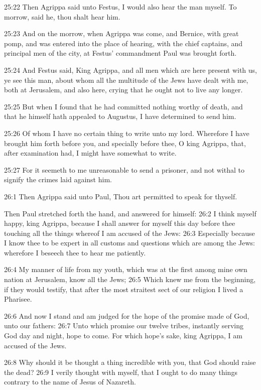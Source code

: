 25:22 Then Agrippa said unto Festus, I would also hear the man myself.  To morrow, said he, thou shalt hear him.

25:23 And on the morrow, when Agrippa was come, and Bernice, with great pomp, and was entered into the place of hearing, with the chief captains, and principal men of the city, at Festus' commandment Paul was brought forth.

25:24 And Festus said, King Agrippa, and all men which are here present with us, ye see this man, about whom all the multitude of the Jews have dealt with me, both at Jerusalem, and also here, crying that he ought not to live any longer.

25:25 But when I found that he had committed nothing worthy of death, and that he himself hath appealed to Augustus, I have determined to send him.

25:26 Of whom I have no certain thing to write unto my lord. Wherefore I have brought him forth before you, and specially before thee, O king Agrippa, that, after examination had, I might have somewhat to write.

25:27 For it seemeth to me unreasonable to send a prisoner, and not withal to signify the crimes laid against him.

26:1 Then Agrippa said unto Paul, Thou art permitted to speak for thyself.

Then Paul stretched forth the hand, and answered for himself: 26:2 I think myself happy, king Agrippa, because I shall answer for myself this day before thee touching all the things whereof I am accused of the Jews: 26:3 Especially because I know thee to be expert in all customs and questions which are among the Jews: wherefore I beseech thee to hear me patiently.

26:4 My manner of life from my youth, which was at the first among mine own nation at Jerusalem, know all the Jews; 26:5 Which knew me from the beginning, if they would testify, that after the most straitest sect of our religion I lived a Pharisee.

26:6 And now I stand and am judged for the hope of the promise made of God, unto our fathers: 26:7 Unto which promise our twelve tribes, instantly serving God day and night, hope to come. For which hope's sake, king Agrippa, I am accused of the Jews.

26:8 Why should it be thought a thing incredible with you, that God should raise the dead?  26:9 I verily thought with myself, that I ought to do many things contrary to the name of Jesus of Nazareth.

